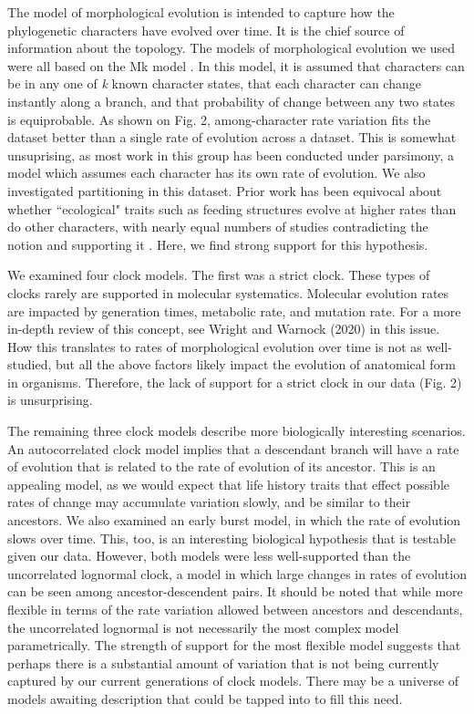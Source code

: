 \documentclass{article}
\begin{document}
The model of morphological evolution is intended to capture how the phylogenetic characters have evolved over time.
It is the chief source of information about the topology.
The models of morphological evolution we used were all based on the Mk model \citep{Lewis2001}. 
In this model, it is assumed that characters can be in any one of \textit{k} known character states, that each character can change instantly along a branch, and that probability of change between any two states is equiprobable.
As shown on Fig. 2, among-character rate variation fits the dataset better than a single rate of evolution across a dataset.
This is somewhat unsuprising, as most work in this group has been conducted under parsimony, a model which assumes each character has its own rate of evolution.
We also investigated partitioning in this dataset.
Prior work has been equivocal about whether ``ecological" traits such as feeding structures evolve at higher rates than do other characters, with nearly equal numbers of studies contradicting the notion \citep{Foote1994,Sanchez-Villagra1998,Ciampaglio2002} and supporting it \citep{Wagner1995,Blomberg2003,HopkinsSmith2015}.
Here, we find strong support for this hypothesis.

We examined four clock models.
The first was a strict clock. 
These types of clocks rarely are supported in molecular systematics.
Molecular evolution rates are impacted by generation times,  metabolic rate, and mutation rate.
For a more in-depth review of this concept, see Wright and Warnock (2020) in this issue. %
How this translates to rates of morphological evolution over time is not as well-studied, but all the above factors likely impact the evolution of anatomical form in organisms. %
Therefore, the lack of support for a strict clock in our data (Fig. 2) is unsurprising.

The remaining three clock models describe more biologically interesting scenarios.
An autocorrelated clock model implies that a descendant branch will have a rate of evolution that is related to the rate of evolution of its ancestor.
This is an appealing model, as we would expect that life history traits that effect possible rates of change may accumulate variation slowly, and be similar to their ancestors. 
We also examined an early burst model, in which the rate of evolution slows over time.
This, too, is an interesting biological hypothesis that is testable given our data.
However, both models were less well-supported than the uncorrelated lognormal clock,
a model in which large changes in rates of evolution can be seen among ancestor-descendent pairs.
It should be noted that while more flexible in terms of the rate variation allowed between ancestors and descendants, the uncorrelated lognormal is not necessarily the most complex model parametrically. 
The strength of support for the most flexible model suggests that perhaps there is a substantial amount of variation that is not being currently captured by our current generations of clock models.
There may be a universe of models awaiting description that could be tapped into to fill this need.
\end{document}
